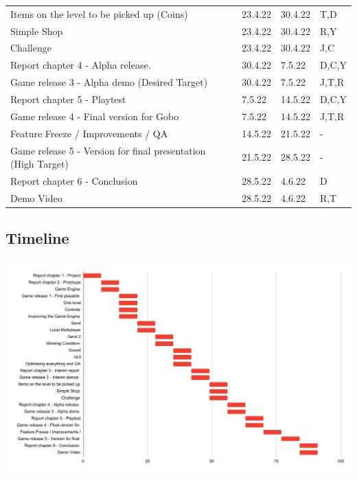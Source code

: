 \begin{tabular}{|l|l|l|l|}
Items on the level to be picked up (Coins)                    & 23.4.22    & 30.4.22  & T,D             \\
Simple Shop                                                   & 23.4.22    & 30.4.22  & R,Y             \\
Challenge                                                     & 23.4.22    & 30.4.22  & J,C             \\
Report chapter 4 - Alpha release.                             & 30.4.22    & 7.5.22   & D,C,Y           \\
Game release 3 - Alpha demo (Desired Target)                  & 30.4.22    & 7.5.22   & J,T,R           \\
Report chapter 5 - Playtest                                   & 7.5.22     & 14.5.22  & D,C,Y           \\
Game release 4 - Final version for Gobo                       & 7.5.22     & 14.5.22  & J,T,R           \\
Feature Freeze / Improvements / QA                            & 14.5.22    & 21.5.22  & -               \\
Game release 5 - Version for final presentation (High Target) & 21.5.22    & 28.5.22  & -               \\
Report chapter 6 - Conclusion                                 & 28.5.22    & 4.6.22   & D               \\
Demo Video                                                    & 28.5.22    & 4.6.22   & R,T             \\
\hline
\end{tabular}
\endgroup

\subsection{Timeline}

\includegraphics[width=\textwidth]{figures/GANTT_chart.pdf}

